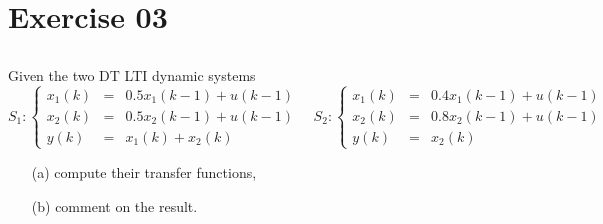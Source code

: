 \section{Exercise 03}
\subsection{}

\begin{frame}
 Given the two DT LTI dynamic systems
 \begin{displaymath}
  S_1:
  \left\{\begin{array}{rcl}
   x_1(k) &=& 0.5x_1(k-1)+u(k-1)\\
   x_2(k) &=& 0.5x_2(k-1)+u(k-1)\\
   y(k)   &=& x_1(k)+x_2(k)
  \end{array}\right. \quad
  S_2:
  \left\{\begin{array}{rcl}
   x_1(k) &=& 0.4x_1(k-1)+u(k-1)\\
   x_2(k) &=& 0.8x_2(k-1)+u(k-1)\\
   y(k)   &=& x_2(k)
  \end{array}\right.
 \end{displaymath}

 \begin{itemize}[<+-| alert@+>]
 \item[(a)] compute their transfer functions,
 \item[(b)] comment on the result.
 \end{itemize}
\end{frame}

